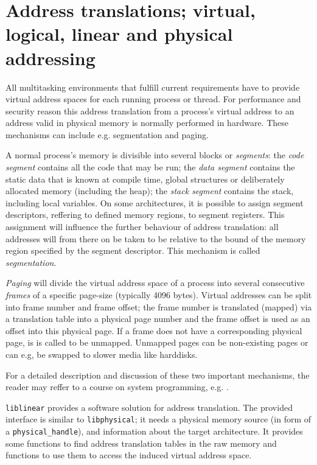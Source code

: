 %
%

\section{Address translations; virtual, logical, linear and physical addressing}
\label{address_translation}

All multitasking environments that fulfill current requirements have to provide
virtual address spaces for each running process or thread. For performance and
security reason this address translation from a process's virtual address to an
address valid in physical memory is normally performed in hardware.  These
mechanisms can include e.g. segmentation and paging.

A normal process's memory is divisible into several blocks or \emph{segments}:
the \emph{code segment} contains all the code that may be run; the \emph{data
segment} contains the static data that is known at compile time, global
structures or deliberately allocated memory (including the heap); the
\emph{stack segment} contains the stack, including local variables.  On some
architectures, it is possible to assign segment descriptors, reffering to
defined memory regions, to segment registers.  This assignment will influence
the further behaviour of address translation: all addresses will from there on
be taken to be relative to the bound of the memory region specified by the
segment descriptor. This mechanism is called \emph{segmentation}.

\emph{Paging} will divide the virtual address space of a process into several
consecutive \emph{frames} of a specific page-size (typically 4096 bytes).
Virtual addresses can be split into frame number and frame offset; the frame
number is translated (mapped) via a translation table into a physical page
number and the frame offset is used as an offset into this physical page. If a
frame does not have a corresponding physical page, is is called to be unmapped.
Unmapped pages can be non-existing pages or can e.g, be swapped to slower media
like harddisks.

For a detailed description and discussion of these two important mechanisms, the
reader may reffer to a course on system programming, e.g.
\cite{rwth_syspro_scriptum:2002}.

\texttt{liblinear} provides a software solution for address translation. The
provided interface is similar to \texttt{libphysical}; it needs a physical
memory source (in form of a \texttt{physical\_handle}), and information about
the target architecture. It provides some functions to find address translation
tables in the raw memory and functions to use them to access the induced virtual
address space.



